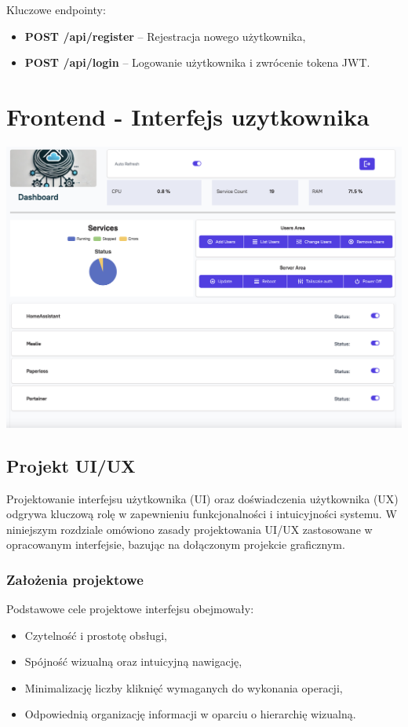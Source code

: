 Kluczowe endpointy:
\begin{itemize}
    \item \textbf{POST /api/register} – Rejestracja nowego użytkownika,
    \item \textbf{POST /api/login} – Logowanie użytkownika i zwrócenie tokena JWT.
\end{itemize}

\section{Frontend - Interfejs uzytkownika}
\includegraphics[width=1\textwidth]{./chapters/assets/user_interface.png}
\subsection{Projekt UI/UX}

Projektowanie interfejsu użytkownika (UI) oraz doświadczenia użytkownika (UX) odgrywa kluczową rolę w zapewnieniu funkcjonalności i intuicyjności systemu. W niniejszym rozdziale omówiono zasady projektowania UI/UX zastosowane w opracowanym interfejsie, bazując na dołączonym projekcie graficznym.

\subsubsection{Założenia projektowe}
Podstawowe cele projektowe interfejsu obejmowały:
\begin{itemize}
    \item Czytelność i prostotę obsługi,
    \item Spójność wizualną oraz intuicyjną nawigację,
    \item Minimalizację liczby kliknięć wymaganych do wykonania operacji,
    \item Odpowiednią organizację informacji w oparciu o hierarchię wizualną.
\end{itemize}

